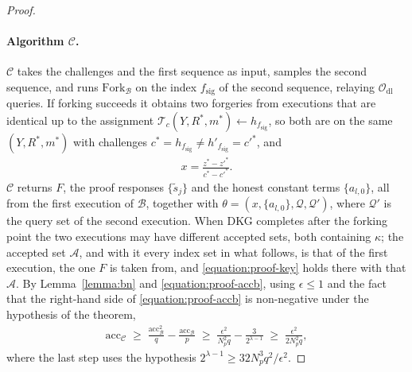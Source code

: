 \documentclass{article}
\theoremstyle{plain}
\theoremstyle{definition}
\theoremstyle{remark}
\begin{document}
\begin{proof}
  \paragraph{Algorithm $\mathcal{C}$.}  $\mathcal{C}$ takes the challenges and the first sequence as input, samples the second sequence, and runs $\mathrm{Fork}_{\mathcal{B}}$ on the index $f_{\mathrm{sig}}$ of the second sequence, relaying $\mathcal{O}_{\mathrm{dl}}$ queries.  If forking succeeds it obtains two forgeries from executions that are identical up to the assignment $\mathcal{T}_c(Y, R^*, m^*) \leftarrow h_{f_{\mathrm{sig}}}$, so both are on the same $(Y, R^*, m^*)$ with challenges $c^* = h_{f_{\mathrm{sig}}} \ne h'_{f_{\mathrm{sig}}} = c'^*$, and
  \begin{align}\label{equation:proof-x}
    x = \frac{z^* - z'^*}{c^* - c'^*}.
  \end{align}
  $\mathcal{C}$ returns $F$, the proof responses $\{\tilde{s}_j\}$ and the honest constant terms $\{a_{l,0}\}$, all from the first execution of $\mathcal{B}$, together with $\theta = (x, \{a_{l,0}\}, \mathcal{Q}, \mathcal{Q}')$, where $\mathcal{Q}'$ is the query set of the second execution.  When DKG completes after the forking point the two executions may have different accepted sets, both containing $\kappa$; the accepted set $\mathcal{A}$, and with it every index set in what follows, is that of the first execution, the one $F$ is taken from, and \eqref{equation:proof-key} holds there with that $\mathcal{A}$.  By Lemma~\ref{lemma:bn} and \eqref{equation:proof-accb}, using $\epsilon \le 1$ and the fact that the right-hand side of \eqref{equation:proof-accb} is non-negative under the hypothesis of the theorem,
  \begin{align}\label{equation:proof-accc}
    \mathrm{acc}_{\mathcal{C}} \;\ge\; \frac{\mathrm{acc}_{\mathcal{B}}^2}{q} - \frac{\mathrm{acc}_{\mathcal{B}}}{p} \;\ge\; \frac{\epsilon^2}{N_p^2 q} - \frac{3}{2^{\lambda - 1}} \;\ge\; \frac{\epsilon^2}{2 N_p^2 q},
  \end{align}
  where the last step uses the hypothesis $2^{\lambda-1} \ge 32 N_p^3 q^2 / \epsilon^2$.


\end{proof}
\end{document}
